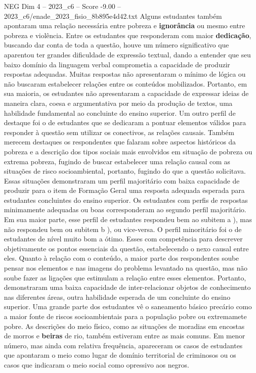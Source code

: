 \begin{textsample}{NEG Dim 4 – 2023\_c6 – Score -9.00 – 2023\_c6/enade\_2023\_fisio\_8b895e4d42.txt}
Alguns estudantes também apontaram uma relação necessária entre pobreza e \textbf{ignorância} ou mesmo entre pobreza e violência.
Entre os estudantes que responderam com maior \textbf{dedicação}, buscando dar conta de toda a questão, houve um número significativo que aparentou ter grandes dificuldade de expressão textual, dando a entender que seu baixo domínio da linguagem verbal comprometia a capacidade de produzir respostas adequadas.
Muitas respostas não apresentaram o mínimo de lógica ou não buscaram estabelecer relações entre os conteúdos mobilizados.
Portanto, em sua maioria, os estudantes não apresentaram a capacidade de expressar ideias de maneira clara, coesa e argumentativa por meio da produção de textos, uma habilidade fundamental ao concluinte do ensino superior.
Um outro perfil de destaque foi o de estudantes que se dedicaram a pontuar elementos válidos para responder à questão sem utilizar os conectivos, as relações causais.
Também merecem destaques os respondentes que falaram sobre aspectos históricos da pobreza e a descrição dos tipos sociais mais envolvidos em situação de pobreza ou extrema pobreza, fugindo de buscar estabelecer uma relação causal com as situações de risco socioambiental, portanto, fugindo do que a questão solicitava.
Essas situações demonstraram um perfil majoritário com baixa capacidade de produzir para o item de Formação Geral uma resposta adequada esperada para estudantes concluintes do ensino superior.
Os estudantes com perfis de respostas minimamente adequadas ou boas corresponderam ao segundo perfil majoritário.
Em sua maior parte, esse perfil de estudantes respondeu bem ao subitem a ), mas não respondeu bem ou subitem b ), ou vice-versa.
O perfil minoritário foi o de estudantes de nível muito bom a ótimo.
Esses com competência para descrever objetivamente os pontos essenciais da questão, estabelecendo o nexo causal entre eles.
Quanto à relação com o conteúdo, a maior parte dos respondentes soube pensar nos elementos e nas imagens do problema levantado na questão, mas não soube fazer as ligações que estimulam a relação entre esses elementos.
Portanto, demonstraram uma baixa capacidade de inter-relacionar objetos de conhecimento nas diferentes áreas, outra habilidade esperada de um concluinte do ensino superior.
Uma grande parte dos estudantes vê o saneamento básico precário como a maior fonte de riscos socioambientais para a população pobre ou extremamete pobre.
As descrições do meio físico, como as situações de moradias em encostas de morros e \textbf{beiras} de rio, também estiveram entre as mais comuns.
Em menor número, mas ainda com relativa frequência, apareceram os casos de estudantes que apontaram o meio como lugar de domínio territorial de criminosos ou os casos que indicaram o meio social como opressivo aos negros.

\end{textsample}
